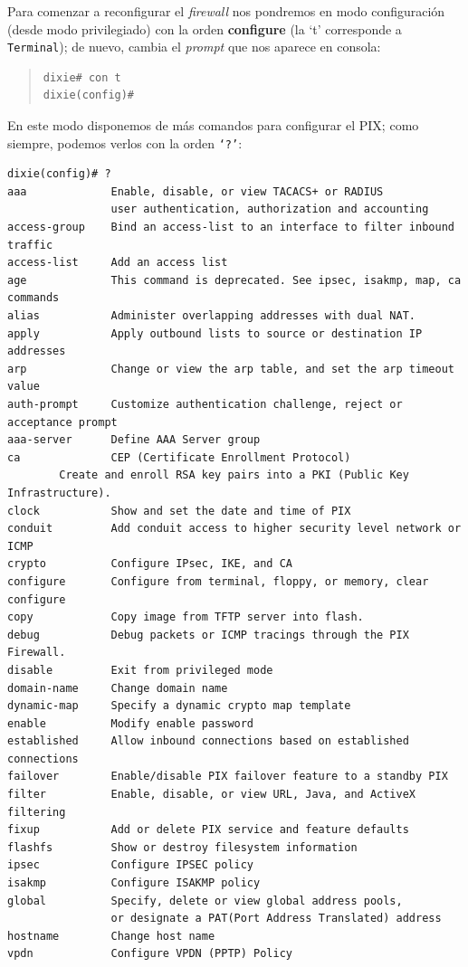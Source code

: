 Para comenzar a reconfigurar el {\it firewall} nos pondremos en modo 
configuraci\'on (desde modo privilegiado) con la orden {\bf configure} (la `t' 
corresponde a {\tt Terminal}); de nuevo, cambia el {\it prompt} que nos aparece 
en consola:
\begin{quote}
\begin{verbatim}
dixie# con t
dixie(config)#
\end{verbatim}
\end{quote}
En este modo disponemos de m\'as comandos para configurar el PIX; como siempre, 
podemos verlos con la orden {\tt `?'}:
\begin{verbatim}
dixie(config)# ?
aaa             Enable, disable, or view TACACS+ or RADIUS
                user authentication, authorization and accounting
access-group    Bind an access-list to an interface to filter inbound traffic
access-list     Add an access list
age             This command is deprecated. See ipsec, isakmp, map, ca commands
alias           Administer overlapping addresses with dual NAT.
apply           Apply outbound lists to source or destination IP addresses
arp             Change or view the arp table, and set the arp timeout value
auth-prompt     Customize authentication challenge, reject or acceptance prompt
aaa-server      Define AAA Server group
ca              CEP (Certificate Enrollment Protocol)
        Create and enroll RSA key pairs into a PKI (Public Key Infrastructure).
clock           Show and set the date and time of PIX
conduit         Add conduit access to higher security level network or ICMP
crypto          Configure IPsec, IKE, and CA
configure       Configure from terminal, floppy, or memory, clear configure
copy            Copy image from TFTP server into flash.
debug           Debug packets or ICMP tracings through the PIX Firewall.
disable         Exit from privileged mode
domain-name     Change domain name
dynamic-map     Specify a dynamic crypto map template
enable          Modify enable password
established     Allow inbound connections based on established connections
failover        Enable/disable PIX failover feature to a standby PIX
filter          Enable, disable, or view URL, Java, and ActiveX filtering
fixup           Add or delete PIX service and feature defaults
flashfs         Show or destroy filesystem information
ipsec           Configure IPSEC policy
isakmp          Configure ISAKMP policy
global          Specify, delete or view global address pools,
                or designate a PAT(Port Address Translated) address
hostname        Change host name
vpdn            Configure VPDN (PPTP) Policy

\end{verbatim}
